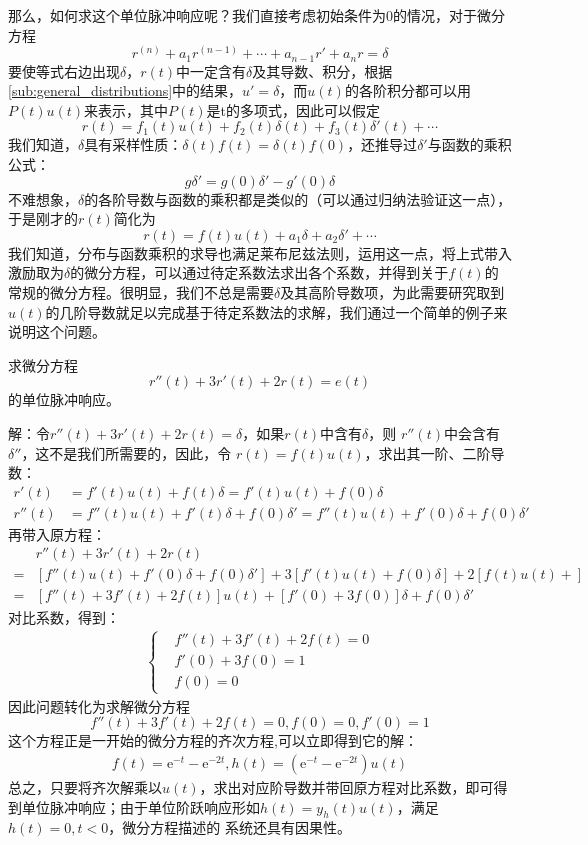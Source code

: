 \documentclass{ctexbook}
\begin{document}
那么，如何求这个单位脉冲响应呢？我们直接考虑初始条件为0的情况，对于微分方程
\[r^{(n)}+a_{1}r^{(n-1)}+\cdots +a_{n-1} r'+a_n r=\delta\]
要使等式右边出现$\delta$，$r(t)$中一定含有$\delta$及其导数、积分，根据\ref{sub:general_distributions}中的结果，$u'=\delta$，而$u(t)$的各阶积分都可以用$P(t)u(t)$来表示，其中$P(t)$是t的多项式，因此可以假定
$$r(t)=f_1(t)u(t)+f_2(t)\delta(t)+f_3(t)\delta'(t)+\cdots$$
我们知道，$\delta$具有采样性质：$\delta(t)f(t)=\delta(t)f(0)$，还推导过$\delta'$与函数的乘积公式：
$$g\delta'=g(0)\delta'-g'(0)\delta$$
不难想象，$\delta$的各阶导数与函数的乘积都是类似的（可以通过归纳法验证这一点），于是刚才的$r(t)$简化为
\[r(t)=f(t)u(t)+a_1\delta+a_2\delta'+\cdots\]
我们知道，分布与函数乘积的求导也满足莱布尼兹法则，运用这一点，将上式带入激励取为$\delta$的微分方程，可以通过待定系数法求出各个系数，并得到关于$f(t)$的常规的微分方程。很明显，我们不总是需要$\delta$及其高阶导数项，为此需要研究取到$u(t)$的几阶导数就足以完成基于待定系数法的求解，我们通过一个简单的例子来说明这个问题。

\begin{example}
    求微分方程
\[r''(t)+3r'(t)+2r(t)=e(t)\]
的单位脉冲响应。

解：令$r''(t)+3r'(t)+2r(t)=\delta$，如果$r(t)$中含有$\delta$，则
$r''(t)$中会含有$\delta''$，这不是我们所需要的，因此，令
$r(t)=f(t)u(t)$，求出其一阶、二阶导数：\begin{align*}
    r'(t)&=f'(t)u(t)+f(t)\delta=f'(t)u(t)+f(0)\delta\\
    r''(t)&=f''(t)u(t)+f'(t)\delta+f(0)\delta'=f''(t)u(t)+f'(0)\delta+f(0)\delta'
\end{align*}
再带入原方程：\begin{align*}
    &r''(t)+3r'(t)+2r(t)\\
    =&\left[f''(t)u(t)+f'(0)\delta+f(0)\delta'\right]+3\left[f'(t)u(t)+f(0)\delta\right]+2\left[f(t)u(t)+\right]\\
    =&\left[f''(t)+3f'(t)+2f(t)\right]u(t)+\left[f'(0)+3f(0)\right]\delta+f(0)\delta'
\end{align*}
对比系数，得到：\begin{align*}\begin{cases}
    &f''(t)+3f'(t)+2f(t)=0\\
    &f'(0)+3f(0)=1\\
    &f(0)=0
\end{cases}
\end{align*}
因此问题转化为求解微分方程
\[f''(t)+3f'(t)+2f(t)=0,f(0)=0,f'(0)=1\]
这个方程正是一开始的微分方程的齐次方程,可以立即得到它的解：
\begin{align*}
    f(t)=\mathrm{e}^{-t}-\mathrm{e}^{-2t},h(t)=\left(\mathrm{e}^{-t}-\mathrm{e}^{-2t}\right)u(t)
\end{align*}
总之，只要将齐次解乘以$u(t)$，求出对应阶导数并带回原方程对比系数，即可得到单位脉冲响应；由于单位阶跃响应形如$h(t)=y_h(t)u(t)$，满足$h(t)=0,t<0$，微分方程描述的
系统还具有因果性。
\end{example}
\end{document}
